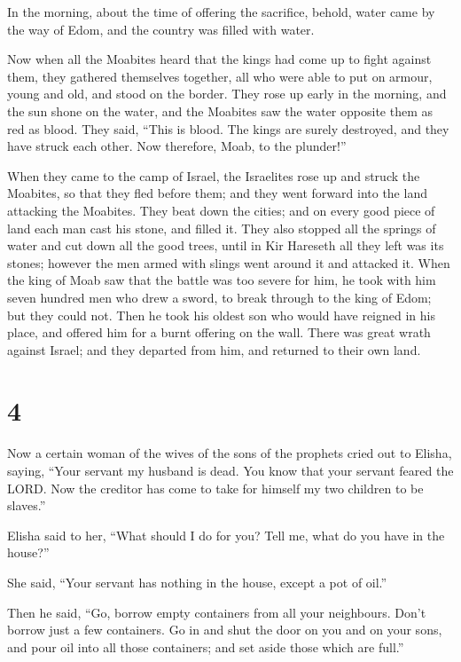  In the morning, about the time of offering the
sacrifice, behold, water came by the way of Edom, and the country was
filled with water.

 Now when all the Moabites heard that the kings had come
up to fight against them, they gathered themselves together, all who
were able to put on armour, young and old, and stood on the border.
 They rose up early in the morning, and the sun shone on
the water, and the Moabites saw the water opposite them as red as blood.
 They said, ``This is blood. The kings are surely
destroyed, and they have struck each other. Now therefore, Moab, to the
plunder!''

 When they came to the camp of Israel, the Israelites
rose up and struck the Moabites, so that they fled before them; and they
went forward into the land attacking the Moabites.  They
beat down the cities; and on every good piece of land each man cast his
stone, and filled it. They also stopped all the springs of water and cut
down all the good trees, until in Kir Hareseth all they left was its
stones; however the men armed with slings went around it and attacked
it.  When the king of Moab saw that the battle was too
severe for him, he took with him seven hundred men who drew a sword, to
break through to the king of Edom; but they could not. 
Then he took his oldest son who would have reigned in his place, and
offered him for a burnt offering on the wall. There was great wrath
against Israel; and they departed from him, and returned to their own
land.

\hypertarget{section-3}{%
\section{4}\label{section-3}}

 Now a certain woman of the wives of the sons of the
prophets cried out to Elisha, saying, ``Your servant my husband is dead.
You know that your servant feared the LORD. Now the creditor has come to
take for himself my two children to be slaves.''

 Elisha said to her, ``What should I do for you? Tell me,
what do you have in the house?''

She said, ``Your servant has nothing in the house, except a pot of
oil.''

 Then he said, ``Go, borrow empty containers from all your
neighbours. Don't borrow just a few containers.  Go in and
shut the door on you and on your sons, and pour oil into all those
containers; and set aside those which are full.''

